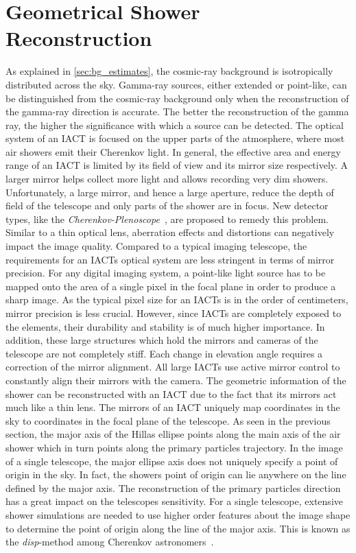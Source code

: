 \section{Geometrical Shower Reconstruction}
\label{sec:direction}
As explained in \cref{sec:bg_estimates}, the cosmic-ray background is isotropically distributed across the sky.
Gamma-ray sources, either extended or point-like, can be distinguished from the cosmic-ray background only when the reconstruction
of the gamma-ray direction is accurate. The better the reconstruction of the gamma ray, the higher the significance with which a 
source can be detected. 
The optical system of an IACT is focused on the upper parts of the atmosphere, where most air showers 
emit their Cherenkov light.
In general, the effective area and energy range of an IACT is limited by its field of view and its mirror size respectively.
A larger mirror helps collect more light and allows recording very dim showers. Unfortunately, 
a large mirror, and hence a large aperture, reduce the depth of field of the telescope and only parts of the shower 
are in focus.  New detector types, like the \emph{Cherenkov-Plenoscope}~\cite{sebastian}, are proposed to remedy this problem. 
Similar to a thin optical lens, aberration effects and distortions can negatively impact the image quality. 
Compared to a typical imaging telescope, the requirements for an IACTs optical system are less stringent in terms of mirror precision. 
For any digital imaging system, a point-like light source has to be mapped onto the area of 
a single pixel in the focal plane in order to produce a sharp image. As the typical pixel size for an IACTs is in the order of centimeters, 
mirror precision is less crucial.
However, since IACTs are completely exposed to the elements, their durability and stability is of much higher importance. 
In addition, these large structures which hold the mirrors and cameras of the telescope are not completely stiff. 
Each change in elevation angle requires a correction of the mirror alignment. All large IACTs use active mirror control 
to constantly align their mirrors with the camera. 
The geometric information of the shower can be reconstructed with an IACT due to the fact that its mirrors act much like a thin lens.  
The mirrors of an IACT uniquely map coordinates in the sky to coordinates in the focal plane of the telescope.
As seen in the previous section, the major axis of the Hillas ellipse points along the main axis of the air shower which in turn points along the primary particles 
trajectory. 
In the image of a single telescope, the major ellipse axis does not uniquely specify a point of origin in the sky.
In fact, the showers point of origin can lie anywhere on the line defined by the major axis. 
The reconstruction of the primary particles direction has a great impact on the telescopes sensitivity. 
For a single telescope, extensive shower simulations are needed to use higher order features about the image shape to determine
the point of origin along the line of the major axis. This is known as the \emph{disp}-method among Cherenkov astronomers~\cite{domingo_disp}. 

